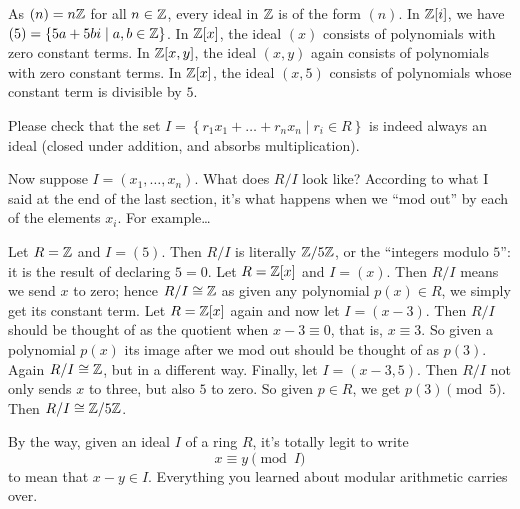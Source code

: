\begin{example}
	\listhack
	\begin{enumerate}[(a)]
		\ii As $(n) = n\mathbb Z$ for all $n \in \mathbb Z$,
		every ideal in $\mathbb Z$ is of the form $(n)$.
		\ii In $\mathbb Z[i]$, we have
		$(5) = \left\{ 5a + 5b i \mid a,b \in \mathbb Z \right\}$.
		\ii In $\mathbb Z[x]$, the ideal $(x)$ consists of polynomials
		with zero constant terms.
		\ii In $\mathbb Z[x,y]$, the ideal $(x,y)$ again consists
		of polynomials with zero constant terms.
		\ii In $\mathbb Z[x]$, the ideal $(x,5)$ consists of polynomials
		whose constant term is divisible by $5$.
	\end{enumerate}
\end{example}
\begin{ques}
	Please check that the set
	$I = \left\{ r_1 x_1 + \dots + r_n x_n \mid r_i \in R \right\}$
	is indeed always an ideal (closed under addition,
	and absorbs multiplication).
\end{ques}
Now suppose $I = (x_1, \dots, x_n)$.
What does $R/I$ look like?
According to what I said at the end of the last section,
it's what happens when we ``mod out'' by each of the elements $x_i$.
For example\dots
\begin{example}
	\listhack
	\begin{enumerate}[(a)]
		\ii Let $R = \mathbb Z$ and $I = (5)$. Then $R/I$ is literally
		$\mathbb Z/5\mathbb Z$, or the ``integers modulo $5$'':
		it is the result of declaring $5 = 0$.
		\ii Let $R = \mathbb Z[x]$ and $I = (x)$.
		Then $R/I$ means we send $x$ to zero; hence $R/I \cong \mathbb Z$
		as given any polynomial $p(x) \in R$,
		we simply get its constant term.
		\ii Let $R = \mathbb Z[x]$ again and now let $I = (x-3)$.
		Then $R/I$ should be thought of as the quotient when $x-3 \equiv 0$,
		that is, $x \equiv 3$.
		So given a polynomial $p(x)$ its image after
		we mod out should be thought of as $p(3)$.
		Again $R/I \cong \mathbb Z$, but in a different way.
		\ii Finally, let $I = (x-3,5)$.
		Then $R/I$ not only sends $x$ to three, but also $5$ to zero.
		So given $p \in R$, we get $p(3) \pmod 5$.
		Then $R/I \cong \mathbb Z/5\mathbb Z$.
	\end{enumerate}
\end{example}
\begin{remark}
	By the way, given an ideal $I$ of a ring $R$, it's totally legit to write
	\[ x \equiv y \pmod I \]
	to mean that $x-y \in I$.
	Everything you learned about modular arithmetic carries over.
\end{remark}

